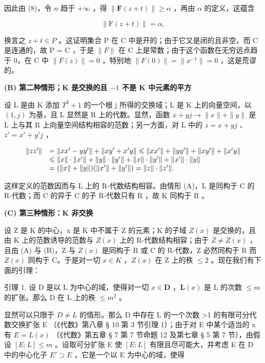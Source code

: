 因此由 (8)，令 \(n\) 趋于 \(+\infty\) ，得 \(\| \mathbf{F}(z + t) \| \geqslant \alpha\) ，再由 \(\alpha\) 的定义，这蕴含

\[
\| \mathrm{F} (z + t) \| = \alpha ,
\]

换言之 \(z + t \in P\) 。这证明集合 P 在 C 中是开的；由于它又是闭的且非空，而 C 是连通的，故 P = C ，于是 \(\|F\|\) 在 C 上是常数；由于这个函数在无穷远点趋于 0，在 C 中 \(\|F(z)\| = 0\) ，特别地 \(\|F(0)\| = \|x^{-1}\| = 0\) ，这是荒谬的。

\textbf{(B) 第二种情形；\(\mathbf{K}\) 是交换的且 \(-1\) 不是 \(\mathbf{K}\) 中元素的平方}\par

设 L 是由 K 添加 \(T^{2} + 1\) 的一个根 j 所得的交换域；L 是 K 上的向量空间，以 \((1, j)\) 为基，且 L 显然是 R 上的代数。显然，函数 \(x + yj \to \|x\| + \|y\|\) 是 L 上与其 R 上向量空间结构相容的范数；另一方面，对 L 中的 \(z = x + yj\) 、\(z' = x' + y'j\) ，

\[
\begin{array}{r l} \| z z ^ {\prime} \| & = \| x x ^ {\prime} - y y ^ {\prime} \| + \| x y ^ {\prime} + x ^ {\prime} y \| \leqslant \| x x ^ {\prime} \| + \| y y ^ {\prime} \| + \| x y ^ {\prime} \| + \| x ^ {\prime} y \| \\ & \leqslant \| x \| \cdot \| x ^ {\prime} \| + \| y \| \cdot \| y ^ {\prime} \| + \| x \| \cdot \| y ^ {\prime} \| + \| x ^ {\prime} \| \cdot \| y \| \\ & = (\| x \| + \| y \|) (\| x ^ {\prime} \| + \| y ^ {\prime} \|) = \| z \| \cdot \| z ^ {\prime} \|. \end{array}
\]

这样定义的范数因而与 L 上的 R-代数结构相容。由情形 (A)，L 是同构于 C 的 R-代数；而 C 的异于 C 的子 R-代数只有 R ，故 K 同构于 R 。

\textbf{(C) 第三种情形：K 非交换}\par

设 Z 是 K 的中心，x 是 K 中不属于 Z 的元素；K 的子域 \(Z(x)\) 是交换的，且由 K 上的范数诱导的范数与 \(Z(x)\) 上的 R-代数结构相容；由于 \(Z \neq Z(x)\) ，且由 (A) 与 (B)，Z 与 \(Z(x)\) 是同构于 R 或 C 的 R-代数，Z 必然同构于 R 而 \(Z(x)\) 同构于 C。于是对一切 \(x \in K\) ，\(Z(x)\) 在 Z 上的秩 \(\leqslant 2\) 。现在我们有下面的引理：

引理 1. 设 D 是以 L 为中心的域，使得对一切 \(x \in \mathbf{D}\) ，\(\mathbf{L}(x)\) 是 L 的次数 \(\leqslant m\) 的扩张。那么 D 在 L 上的秩 \(\leqslant m^2\) 。

显然可以只限于 \(D \neq L\) 的情形。那么 D 中存在 L 的一个次数 >1 的有限可分代数交换扩张 E （《代数》第八章 § 10 第 3 节引理 1）；由于对 E 中某个适当的 x 有 \(E = L(x)\) （《代数》第五章 § 7 第 7 节命题 12 及第七章 § 5 第 7 节），由假设 \([E: L] \leqslant m\) 。设取可分扩张 E 使 \([E: L]\) 有限且尽可能大，并考虑 E 在 D 中的中心化子 \(E' \supset E\) ，它是一个以 E 为中心的域，使得

